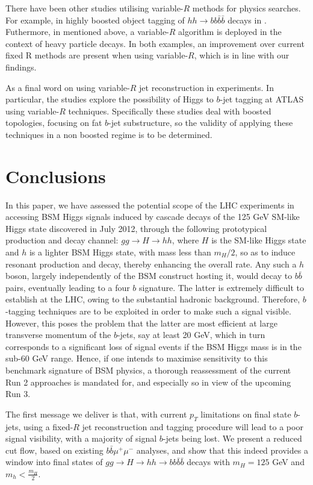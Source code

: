 \documentclass[12pt]{article}
\begin{document}
There have been other studies utilising variable-$R$ methods for physics searches. For example, in highly boosted object tagging of $hh \rightarrow bb\bar{b}\bar{b}$ decays in \cite{ATLAS:2016hcf}. Futhermore, in \cite{Lapsien:2016zor} mentioned above, a variable-$R$ algorithm is deployed in the context of heavy particle decays. In both examples, an improvement over current fixed R methods are present when using variable-$R$, which is in line with our findings.

As a final word on using variable-$R$ jet reconstruction in experiments. In particular, the studies \cite{ATLAS:2017juw, ATLAS:2020udg} explore the possibility of Higgs to $b$-jet tagging at ATLAS using variable-$R$ techniques. Specifically these studies deal with boosted topologies, focusing on fat $b$-jet substructure, so the validity of applying these techniques in a non boosted regime is to be determined. 

\section{Conclusions}
In this paper, we have assessed the potential scope of the LHC
experiments in accessing BSM Higgs signals induced by cascade decays
of the 125 GeV SM-like Higgs state discovered in July 2012, through
the following prototypical production and decay channel: $gg\to H\to
hh$, where $H$ is the SM-like Higgs state and $h$ is a lighter BSM
Higgs state, with mass less than $m_H/2$, so as to induce resonant
production and decay, thereby enhancing the overall rate. Any such a
$h$ boson, largely independently of the BSM construct hosting it,
would decay to $b\bar b$ pairs, eventually leading to a four $b$
signature. The latter is extremely difficult to establish at the LHC,
owing to the substantial hadronic background. Therefore,
$b$-tagging techniques are to be exploited in order to make such a
signal visible. However, this poses the problem that the latter are
most efficient at large transverse momentum of the $b$-jets, say at
least 20 GeV, which in turn corresponds to a significant loss of
signal events if the BSM Higgs mass is in the sub-60 GeV range. Hence,
if one intends to maximise sensitivity to this benchmark signature of
BSM physics, a thorough reassessment of the current Run 2 approaches
is mandated for, and especially so in view of the upcoming Run 3. 

The first message we deliver is that, with current $p_T$ limitations on final state $b$-jets, using a fixed-$R$ jet reconstruction and tagging procedure will lead to a poor signal visibility, with a majority of signal $b$-jets being lost. We present a reduced cut flow, based on existing $b\bar b\mu^+\mu^-$ analyses, and show that this indeed provides a window into final states of $gg \rightarrow H \rightarrow hh \rightarrow bb\bar{b}\bar{b}$ decays with $m_H = 125$ GeV and $m_h < \frac{m_H}{2}$. 
\end{document}
